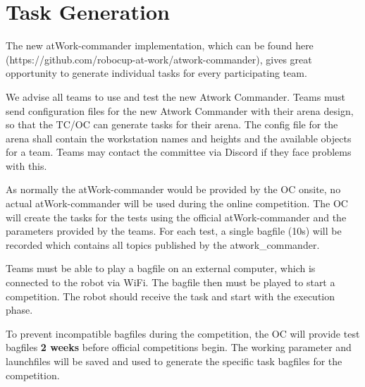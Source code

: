 

\section{Task Generation} 
\label{sec:VRCTaskGen}

The new atWork-commander implementation, which can be found here (https://github.com/robocup-at-work/atwork-commander), 
gives great opportunity to generate individual tasks for every participating team.

We advise all teams to use and test the new Atwork Commander. Teams must send configuration files for the new Atwork Commander with their arena design, so that the TC/OC can generate tasks for their arena. The config file for the arena shall contain the workstation names and heights and the available objects for a team. Teams may contact the committee via Discord if they face problems with this.  

As normally the atWork-commander would be provided by the OC onsite, no actual atWork-commander will be used during the online competition.
The OC will create the tasks for the tests using the official atWork-commander and the parameters provided by the teams. 
For each test, a single bagfile (10s) will be recorded which contains all topics published by the atwork\_commander.

Teams must be able to play a bagfile on an external computer, which is connected to the robot via WiFi.
The bagfile then must be played to start a competition. The robot should receive the task and start with the execution phase.

To prevent incompatible bagfiles during the competition, 
the OC will provide test bagfiles \textbf{2 weeks} before official competitions begin.
The working parameter and launchfiles will be saved and used to generate the specific task bagfiles for the competition.

